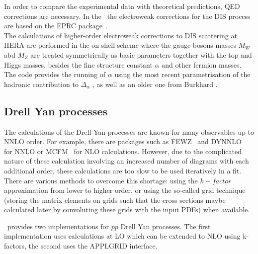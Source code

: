 In order to compare the experimental data with theoretical predictions, 
QED corrections are necessary. In the \fitter\, the electroweak corrections 
for the DIS process are based on the EPRC package~\cite{SpiesbergerPrivComm}.
\\
The calculations of higher-order electroweak corrections to DIS scattering at HERA are performed
in the on-shell scheme where the gauge bosons masses $M_W$ abd $M_Z$ are treated symmetrically
as basic parameters together with the top and Higgs masses, besides the fine structure constant 
$\alpha$ and other fermion masses.
\\
The code provides the running of $\alpha$ using the most recent parametrisation
of the hadronic contribution to $\Delta_\alpha$ \cite{Jegerlehner}, as well as an older 
one from Burkhard \cite{Burkhard}.

\subsection{Drell Yan processes}

%
The calculations of the Drell Yan processes are known for many observables up to NNLO order.
For example, there are packages such as FEWZ~\cite{FEWZ} and DYNNLO~\cite{DYNNLO} for NNLO
or MCFM~\cite{MCFM} for NLO calculations. However, due to the complicated nature of these
calculation involving an increased number of diagrams with each additional order, these 
calculations are too slow to be used iteratively in a fit.
There are various methods to overcome this shortage: using the $k-factor$ approximation 
from lower to higher order, or using the so-called grid technique 
(storing the matrix elements on grids such that the cross sections maybe calculated later by 
convoluting these grids with the input PDFs) when available.
  
\fitter\ provides two implementations for $pp$  Drell Yan processes.
The first implementation uses calculations at LO which can be extended to NLO using k-factors,
the second uses the APPLGRID interface. 
%


